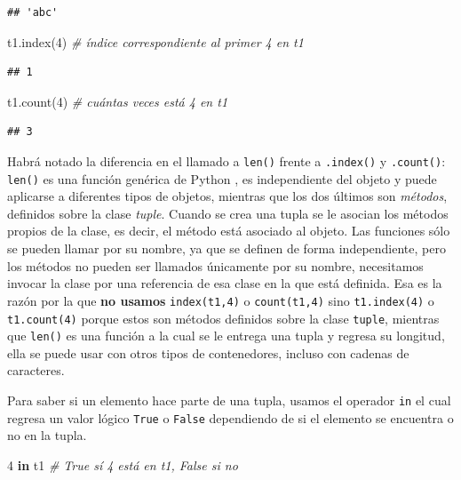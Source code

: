 \documentclass[
]{book}
\newenvironment{Shaded}{\begin{snugshade}}{\end{snugshade}}
\newcommand{\CommentTok}[1]{\textcolor[rgb]{0.56,0.35,0.01}{\textit{#1}}}
\newcommand{\DecValTok}[1]{\textcolor[rgb]{0.00,0.00,0.81}{#1}}
\newcommand{\KeywordTok}[1]{\textcolor[rgb]{0.13,0.29,0.53}{\textbf{#1}}}
\newcommand{\NormalTok}[1]{#1}
\theoremstyle{definition}
\theoremstyle{definition}
\theoremstyle{definition}
\theoremstyle{definition}
\theoremstyle{remark}
\begin{document}
\begin{verbatim}
## 'abc'
\end{verbatim}

\begin{Shaded}
\begin{Highlighting}[]
\NormalTok{t1.index(}\DecValTok{4}\NormalTok{)    }\CommentTok{\# índice correspondiente al primer 4 en t1}
\end{Highlighting}
\end{Shaded}

\begin{verbatim}
## 1
\end{verbatim}

\begin{Shaded}
\begin{Highlighting}[]
\NormalTok{t1.count(}\DecValTok{4}\NormalTok{)    }\CommentTok{\# cuántas veces está 4 en t1 }
\end{Highlighting}
\end{Shaded}

\begin{verbatim}
## 3
\end{verbatim}

Habrá notado la diferencia en el llamado a \texttt{len()} frente a \texttt{.index()} y \texttt{.count()}: \texttt{len()} es una función genérica de Python , es independiente del objeto y puede aplicarse a diferentes tipos de objetos, mientras que los dos últimos son \emph{métodos}, definidos sobre la clase \emph{tuple}. Cuando se crea una tupla se le asocian los métodos propios de la clase, es decir, el método está asociado al objeto. Las funciones sólo se pueden llamar por su nombre, ya que se definen de forma independiente, pero los métodos no pueden ser llamados únicamente por su nombre, necesitamos invocar la clase por una referencia de esa clase en la que está definida. Esa es la razón por la que \textbf{no usamos} \texttt{index(t1,4)} o \texttt{count(t1,4)} sino \texttt{t1.index(4)} o \texttt{t1.count(4)} porque estos son métodos definidos sobre la clase \texttt{tuple}, mientras que \texttt{len()} es una función a la cual se le entrega una tupla y regresa su longitud, ella se puede usar con otros tipos de contenedores, incluso con cadenas de caracteres.

Para saber si un elemento hace parte de una tupla, usamos el operador \texttt{in} el cual regresa un valor lógico \texttt{True} o \texttt{False} dependiendo de si el elemento se encuentra o no en la tupla.

\begin{Shaded}
\begin{Highlighting}[]
\DecValTok{4} \KeywordTok{in}\NormalTok{ t1     }\CommentTok{\# True sí 4 está en t1, False si no  }
\end{Highlighting}
\end{Shaded}
\end{document}
